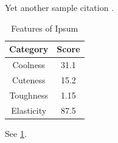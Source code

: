 \lipsum[16-20] Yet another sample citation \cite{turing1950}.
\begin{table}[h!]
    \centering
    \begin{tabular}{|c|c|}
        \hline
        Category & Score \\
        \hline
        Coolness & 31.1 \\
        Cuteness & 15.2 \\
        Toughness & 1.15 \\
        Elasticity & 87.5 \\
        \hline
    \end{tabular}
    \caption{Features of Ipsum}
    \label{tab:placeholder}
\end{table}
\lipsum[21-23] See \cref{tab:placeholder}.